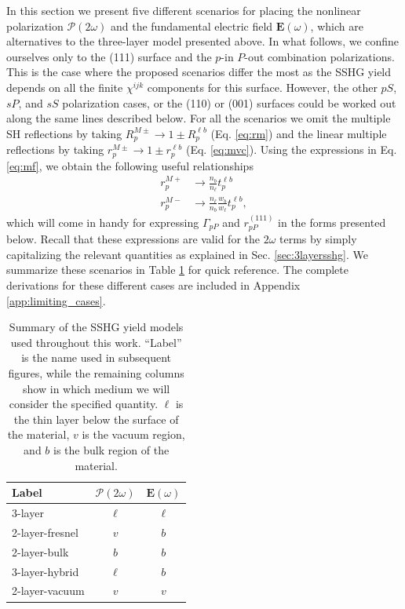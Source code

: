 In this section we present five different scenarios for placing the nonlinear
polarization $\boldsymbol{\mathcal{P}}(2\omega)$ and the fundamental electric
field $\mathbf{E}(\omega)$, which are alternatives to the three-layer model
presented above. In what follows, we confine ourselves only to the (111) surface
and the $p$-in $P$-out combination polarizations. This is the case where the
proposed scenarios differ the most as the SSHG yield depends on all the finite
$\chi^{ijk}$ components for this surface. However, the other $pS$, $sP$, and
$sS$ polarization cases, or the (110) or (001) surfaces could be worked out
along the same lines described below. For all the scenarios we omit the multiple
SH reflections by taking $R^{M\pm}_{p}\to 1\pm R^{\ell b}_{p}$ (Eq.
\eqref{eq:rm}) and the linear multiple reflections by taking $r^{M\pm}_{p}\to
1\pm r^{\ell b}_{p}$ (Eq. \eqref{eq:mvc}). Using the expressions in Eq.
\eqref{eq:mf}, we obtain the following useful relationships
\begin{equation}\label{eq:mvc89}
\begin{split}
r^{M+}_{p}&\to\frac{n_{b}}{n_{\ell}}t^{\ell b}_{p}\\
r^{M-}_{p}&\to\frac{n_{\ell}}{n_{b}}\frac{w_{b}}{w_{\ell}}t^{\ell b}_{p},
\end{split}
\end{equation}
which will come in handy for expressing $\Gamma_{pP}$ and $r^{(111)}_{pP}$ in
the forms presented below. Recall that these expressions are valid for the
$2\omega$ terms by simply capitalizing the relevant quantities as explained in
Sec. \ref{sec:3layersshg}. We summarize these scenarios in Table
\ref{tab:models} for quick reference. The complete derivations for these
different cases are included in Appendix \ref{app:limiting_cases}.

\begin{table}[t]
\centering
\begin{tabular}{| l | c | c |}
\hline 
Label         &  $\boldsymbol{\mathcal{P}}(2\omega)$  &  $\mathbf{E}(\omega)$ \\
\hline 
3-layer         &          $\ell$           &      $\ell$   \\
2-layer-fresnel &            $v$            &        $b$    \\
2-layer-bulk    &            $b$            &        $b$    \\
3-layer-hybrid  &          $\ell$           &        $b$    \\
2-layer-vacuum  &            $v$            &        $v$    \\
\hline 
\end{tabular}
\caption{Summary of the SSHG yield models used throughout this work. ``Label''
is the name used in subsequent figures, while the remaining columns show in
which medium we will consider the specified quantity. $\ell$ is the thin layer
below the surface of the material, $v$ is the vacuum region, and $b$ is the bulk
region of the material.}
\label{tab:models}
\end{table}


